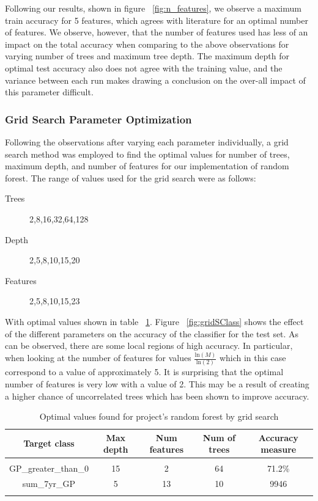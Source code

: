 \documentclass{article} %
\begin{document}
Following our results, shown in figure ~\ref{fig:n_features}, we observe a maximum train accuracy for 5 features, which agrees with literature for an optimal number of features. We observe, however, that the number of features used has less of an impact on the total accuracy when comparing to the above observations for varying number of trees and maximum tree depth. The maximum depth for optimal test accuracy also does not agree with the training value, and the variance between each run makes drawing a conclusion on the over-all impact of this parameter difficult.

\subsubsection{Grid Search Parameter Optimization}

Following the observations after varying each parameter individually, a grid search method was employed to find the optimal values for number of trees, maximum depth, and number of features for our implementation of random forest. The range of values used for the grid search were as follows:

\begin{description}
\item [Trees] 2,8,16,32,64,128
\item [Depth] 2,5,8,10,15,20
\item [Features] 2,5,8,10,15,23
\end{description}

With optimal values shown in table ~\ref{opt-table}. Figure ~\ref{fig:gridSClass} shows the effect of the different parameters on the accuracy of the classifier for the test set. As can be observed, there are some local regions of high accuracy. In particular, when looking at the number of features for values $\frac{\text{ln}(M)}{\text{ln}(2)}$ which in this case correspond to a value of approximately 5. It is surprising that the optimal number of features is very low with a value of 2. This may be a result of creating a higher chance of uncorrelated trees which has been shown to improve accuracy. \cite{Bharathidason2014}

\begin{table}[h]
\caption{Optimal values found for project's random forest by grid search}
\begin{center}
\begin{tabular}{ccccc}
{\bf Target class} &{\bf Max depth} &{\bf Num features} &{\bf Num of trees}&{\bf Accuracy measure}
\\ \hline \\
GP\_greater\_than\_0         &15	&2	&64 &71.2\%\\
sum\_7yr\_GP         		&5	&13	&10 	&9946\\
\label{opt-table}
\end{tabular}
\end{center}
\end{table}
\end{document}
